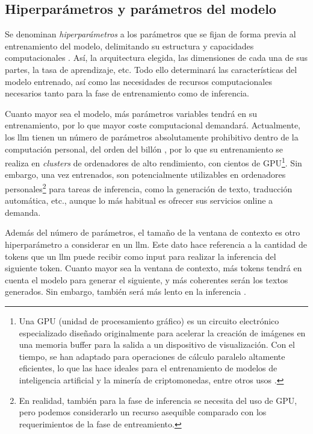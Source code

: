 \subsection{Hiperparámetros y parámetros del modelo}
\label{sec:hiperparametros_ventana}


Se denominan \emph{hiperparámetros} a los parámetros que se fijan de forma previa al entrenamiento del modelo, delimitando su estructura y capacidades computacionales \citep{QueEsAjuste}. Así, la arquitectura elegida, las dimensiones de cada una de sus partes, la tasa de aprendizaje, etc. Todo ello determinará las características del modelo entrenado, así como las necesidades de recursos computacionales necesarios tanto para la fase de entrenamiento como de inferencia.

Cuanto mayor sea el modelo, más parámetros variables tendrá en su entrenamiento, por lo que mayor coste computacional demandará. Actualmente, los \gls{llm} tienen un número de parámetros absolutamente prohibitivo dentro de la computación personal, del orden del billón \citep{radfordLanguageModelsAre2019}, por lo que su entrenamiento se realiza en \emph{clusters} de ordenadores de alto rendimiento, con cientos de GPU\footnote{Una GPU (unidad de procesamiento gráfico) es un circuito electrónico especializado diseñado originalmente para acelerar la creación de imágenes en una memoria buffer para la salida a un dispositivo de visualización. Con el tiempo, se han adaptado para operaciones de cálculo paralelo altamente eficientes, lo que las hace ideales para el entrenamiento de modelos de inteligencia artificial y la minería de criptomonedas, entre otros usos \citep{GPUWikipedia}.}. Sin embargo, una vez entrenados, son potencialmente utilizables en ordenadores personales\footnote{En realidad, también para la fase de inferencia se necesita del uso de GPU, pero podemos considerarlo un recurso asequible comparado con los requerimientos de la fase de entreamiento.} para tareas de inferencia, como la generación de texto, traducción automática, etc., aunque lo más habitual es ofrecer sus servicios online a demanda.

Además del número de parámetros, el tamaño de la ventana de contexto es otro hiperparámetro a considerar en un \gls{llm}. Este dato hace referencia a la cantidad de {tokens} que un \gls{llm} puede recibir como input para realizar la inferencia del siguiente {token}. Cuanto mayor sea la ventana de contexto, más tokens tendrá en cuenta el modelo para generar el siguiente, y más coherentes serán los textos generados. Sin embargo, también será más lento en la inferencia \citep{gonzaloAsomandonosVentanaContextual2023}.



